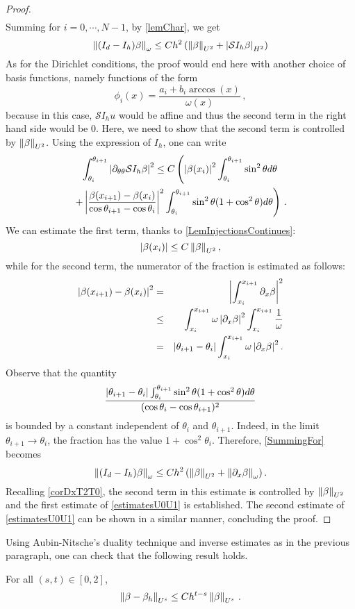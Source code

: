 \documentclass[a4paper]{article}
\begin{document}
\begin{proof}
\begin{eqnarray*}
	\end{eqnarray*}
	Summing for $i = 0, \cdots, N-1$, by \autoref{lemChar}, we get
	\begin{equation}
		\left\|(I_d - I_h)\beta\right\|_{\omega} \leq Ch^2\left(\left\|\beta\right\|_{U^2} + \left\lvert \mathcal{S}I_h \beta \right\rvert_{H^2}\right)
		\label{SummingFor}
	\end{equation}
	As for the Dirichlet conditions, the proof would end here with another choice of basis functions, namely functions of the form
	\[\phi_i(x) = \frac{a_i + b_i \arccos(x)}{\omega(x)}\,,\]
	because in this case, $\mathcal{S}I_h u$ would be affine and thus the second term in the right hand side would be $0$. Here, we need to show that the second term is controlled by $\left\|\beta\right\|_{U^2}$. Using the expression of $I_h$, one can write
	\begin{multline}
	\int_{\theta_i}^{\theta_{i+1}} \left\lvert \partial_{\theta\theta}\mathcal{S} I_h\beta \right\rvert^2\leq C\left(\left\lvert  \beta(x_i) \right\rvert^2 \int_{\theta_i}^{\theta_{i+1}} \sin^2\theta d\theta \right.\\
	\left.+ \left\lvert \frac{\beta(x_{i+1}) -  \beta(x_{i})}{\cos\theta_{i+1} - \cos\theta_i} \right\rvert^2 \int_{\theta_i}^{\theta_{i+1}} \sin^2\theta(1 + \cos^2\theta)d\theta\right)\,.
	\label{CalculIntermediaire}
	\end{multline}
	We can estimate the first term, thanks to \autoref{LemInjectionsContinues}:
	\[\left\lvert  \beta(x_i) \right\rvert \leq C \left\|\beta\right\|_{U^2},\]
	while for the second term, the numerator of the fraction is estimated as follows: 
	\begin{eqnarray*}
		\left\lvert \beta(x_{i+1}) - \beta(x_i) \right\rvert^2 &=& \left\lvert  \int_{x_i}^{x_{i+1}} \partial_x  \beta \right\rvert^2 \\
		& \leq & \int_{x_i}^{x_{i+1}} \omega \left\lvert \partial_x \beta \right\rvert^2 \int_{x_i}^{x_{i+1}} \frac{1}{\omega} \\
		&  = & \left\lvert \theta_{i+1} - \theta_i \right\rvert\int_{x_i}^{x_{i+1}} \omega \left\lvert \partial_x \beta \right\rvert^2.
	\end{eqnarray*}
	Observe that the quantity 
	\[\frac{\left\lvert \theta_{i+1} - \theta_i \right\rvert \int_{\theta_i}^{\theta_{i+1}}{\sin^2\theta(1 + \cos^2\theta)d\theta}}{(\cos\theta_{i} - \cos\theta_{i+1})^2}\]
	is bounded by a constant independent of $\theta_i$ and $\theta_{i+1}$. Indeed, in the limit $\theta_{i+1} \to \theta_{i}$, the fraction has the value $1 + \cos^2\theta_i$. Therefore, \eqref{SummingFor} becomes
	\[\left\|(I_d - I_h)\beta\right\|_{\omega} \leq C h^2\left(\left\|\beta\right\|_{U^2} + \left\|\partial_x \beta\right\|_{\omega}\right).\]
	Recalling \autoref{corDxT2T0}, the second term in this estimate is controlled by $\left\|\beta\right\|_{U^2}$ and the first estimate of \eqref{estimatesU0U1} is established. 
	The second estimate of \eqref{estimatesU0U1} can be shown in a similar manner, concluding the proof.  
\end{proof}
\noindent Using Aubin-Nitsche's duality technique and inverse estimates as in the previous paragraph, one can check that the following result holds.
\begin{Cor}
	For all $(s,t) \in [0,2]$, 
	\[\left\|\beta - \beta_h\right\|_{U^s} \leq C h^{t - s}\left\|\beta\right\|_{U^s}\,.\]
\end{Cor}
\end{document}
